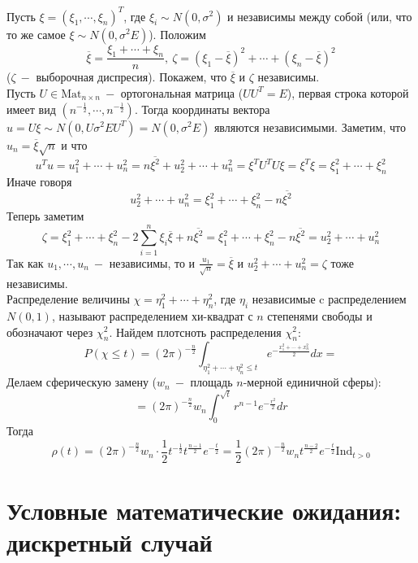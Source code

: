 \begin{example}
Пусть $\xi = \left(\xi_1, \cdots, \xi_n\right) ^ T$, где $\xi_i \sim N\left(0, \sigma ^ 2\right)$ и независимы между собой (или, что то же самое $\xi \sim N\left(0, \sigma ^ 2 E\right) $). Положим
\[
    \overline{\xi} = \frac{\xi_1 + \cdots + \xi_n}{n}, \ \zeta = \left(\xi_1 - \overline{\xi}\right) ^ 2
     + \cdots + \left(\xi_n - \overline{\xi}\right) ^ 2
\]
($\zeta \ - $ выборочная диспресия). Покажем, что $\overline{\xi}$ и $\zeta$ независимы. \\
Пусть $U \in \text{Mat}_{n \times n} \ - $ ортогональная матрица ($U U ^ T = E$), первая строка которой имеет вид $\left(n ^ {-\frac 1 2}, \cdots, n ^ {-\frac 1 2}\right)$. Тогда координаты вектора $u = U \xi \sim N\left(0, U \sigma ^ 2 E U ^ T\right) = N\left(0, \sigma ^ 2 E\right)$ являются независимыми. Заметим, что $u_{n}= \overline{\xi}\sqrt{n}$ и что
\[
    u ^ T u = u_1 ^ 2 + \cdots + u_n ^ 2 = n \overline{\xi ^ 2} + u_2 ^ 2 + \cdots + u_n ^ 2= \xi ^ T U ^ T U \xi = \xi ^ T \xi = \xi_1 ^ 2 + \cdots + \xi_n ^ 2
\]
Иначе говоря
\[
    u_2 ^ 2 + \cdots + u_n ^ 2 = \xi_1 ^ 2 + \cdots + \xi_n ^ 2 - n \overline{\xi ^ 2} 
\]
Теперь заметим
\[
    \zeta = \xi_1 ^ 2 + \cdots + \xi_n ^ 2 - 2 \sum_{i = 1}^{n} \xi_i \overline{\xi} + n \overline{\xi ^ 2}
    = \xi_1 ^ 2 + \cdots + \xi_n ^ 2 - n \overline{\xi ^ 2} = u_2 ^ 2 + \cdots + u_n ^ 2
\]
Так как $u_1, \cdots , u_n \ -$ независимы, то и $\frac{u_1}{\sqrt{n}} = \overline{\xi}$ и $u_2 ^ 2 + \cdots + u_n ^ 2 = \zeta$ тоже независимы. \\
Распределение величины $\chi = \eta_1^2 + \cdots + \eta_n^2$, где $\eta_i$ независимые c распределением $N\left(0, 1\right)$, называют распределением хи-квадрат с $n$ степенями свободы и обозначают через $\chi_{n} ^ 2$. 
Найдем плотсноть распределения $\chi_n ^ 2$:
\[
    P\left(\chi \leq t\right) = \left(2 \pi\right) ^ {-\frac{n}{2}} \int_{\eta_1 ^ 2 + \cdots + \eta_n ^ 2 \leq t} e ^ {-\frac{x_1 ^ 2 + \cdots + x_n ^ 2}{2}} dx = 
 \]
 Делаем сферическую замену ($w_n \ -$ площадь $n$-мерной единичной сферы):
 \[
     = \left(2 \pi\right) ^ {-\frac{n}{2}} w_n \int_{0}^{\sqrt{t}} r ^ {n - 1} e ^ {-\frac{ r ^ 2} 2} dr
 \]
 Тогда 
 \[
    \rho\left(t\right) = \left(2 \pi\right) ^ {-\frac{n}{2}} w_n \cdot \frac{1}{2} t ^ {-\frac{1}{2}} t ^ {\frac{n - 1}{2}} e ^ {-\frac{ t} 2} =  \frac{1}{2}  \left(2 \pi\right) ^ {-\frac{n}{2}} w_n  t ^ {\frac{n - 2}{2}} e ^ {-\frac{t}{2}} \text{Ind}_{t > 0}
 \]
\end{example}

\clearpage
 \section{Условные математические ожидания: дискретный случай}

